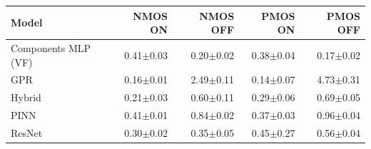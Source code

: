 \begin{tabular}{lrrrr}
\toprule
Model & NMOS ON & NMOS OFF & PMOS ON & PMOS OFF \\
\midrule
Components MLP (VF) & 0.41$\pm$0.03 & 0.20$\pm$0.02 & 0.38$\pm$0.04 & 0.17$\pm$0.02 \\
GPR & 0.16$\pm$0.01 & 2.49$\pm$0.11 & 0.14$\pm$0.07 & 4.73$\pm$0.31 \\
Hybrid & 0.21$\pm$0.03 & 0.60$\pm$0.11 & 0.29$\pm$0.06 & 0.69$\pm$0.05 \\
PINN & 0.41$\pm$0.01 & 0.84$\pm$0.02 & 0.37$\pm$0.03 & 0.96$\pm$0.04 \\
ResNet & 0.30$\pm$0.02 & 0.35$\pm$0.05 & 0.45$\pm$0.27 & 0.56$\pm$0.04 \\
\bottomrule
\end{tabular}
